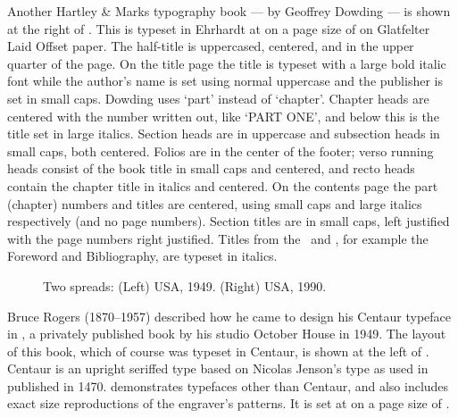 \documentclass[10pt,letterpaper,extrafontsizes]{memoir}
\begin{document}
Another Hartley \& Marks typography book ---  by Geoffrey
Dowding --- is shown at the right of
.  This is typeset in Ehrhardt at
 on a page size of  on
Glatfelter Laid Offset paper.  The
half-title is uppercased, centered, and in the upper
quarter of the page. On the title page the title is
typeset with a large bold italic font while the author's name is set
using normal uppercase and the publisher is set in small caps. Dowding
uses `part' instead of `chapter'.  Chapter heads
are centered with the number written out, like `PART ONE', and below
this is the title set in large italics.  Section
heads are in uppercase and subsection heads in small caps, both
centered. Folios are in the center of the
footer; verso running heads
consist of the book title in small caps and centered, and recto heads
contain the chapter title in italics and centered. On the
contents page the part (chapter) numbers and titles
are centered, using small caps and large italics respectively (and no
page numbers). Section titles are in small caps, left justified with
the page numbers right justified. Titles from the \pixfrontmatter\ and
\pixbackmatter, for example the Foreword and Bibliography, are typeset
in italics.



\begin{figure}
\centering
\begin{minipage}[b]{\pwlayi}
\end{minipage}
\hfill
\begin{minipage}[b]{\pwlayi}
\end{minipage}
\caption[Two spreads: USA, 1949 and 1990]%
        {Two spreads: (Left) USA, 1949.
         (Right) USA, 1990.} \label{fb:4}
\end{figure}

    Bruce Rogers (1870--1957) 
described how he came to design his Centaur typeface in
, a privately published book by his studio October
House in 1949. The layout of this book, which of course was typeset in
Centaur, is shown at the left of . Centaur is an upright
seriffed type based on Nicolas Jenson's type as 
used in  published in 1470. 
 demonstrates typefaces other than
Centaur, and also includes exact size reproductions of the engraver's 
patterns. It is set at  on a page size of .
\end{document}
